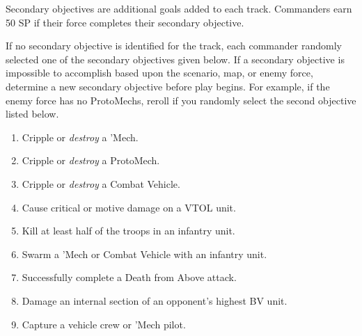 Secondary objectives are additional goals added to each track.
Commanders earn 50 SP if their force completes their secondary objective.

If no secondary objective is identified for the track, each commander randomly selected one of the secondary objectives given below.
If a secondary objective is impossible to accomplish based upon the scenario, map, or enemy force, determine a new secondary objective before play begins.
For example, if the enemy force has no ProtoMechs, reroll if you randomly select the second objective listed below.

\begin{enumerate}

  \item Cripple or \emph{destroy} a 'Mech.

  \item Cripple or \emph{destroy} a ProtoMech.

  \item Cripple or \emph{destroy} a Combat Vehicle.

  \item Cause critical or motive damage on a VTOL unit.

  \item Kill at least half of the troops in an infantry unit.

  \item Swarm a 'Mech or Combat Vehicle with an infantry unit.

  \item Successfully complete a Death from Above attack.

  \item Damage an internal section of an opponent's highest BV unit.

  \item Capture a vehicle crew or 'Mech pilot.

\end{enumerate}
